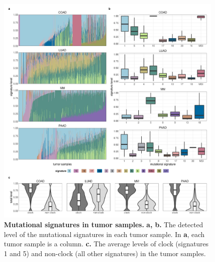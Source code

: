\documentclass[english, 10pt, letterpaper]{article}
\begin{document}
\begin{figure}[h!]
\centering
\includegraphics[width=180mm]{figures/Supp_Fig_1.jpeg}
\caption{
    \textbf{Mutational signatures in tumor samples.}
    \textbf{a, b.} The detected level of the mutational signatures in each tumor sample. In \textbf{a}, each tumor sample is a column.
    \textbf{c.} The average levels of clock (signatures 1 and 5) and non-clock (all other signatures) in the tumor samples.
}
\label{sfig:mutational-signatures-supp}
\end{figure}
\newpage
\end{document}
